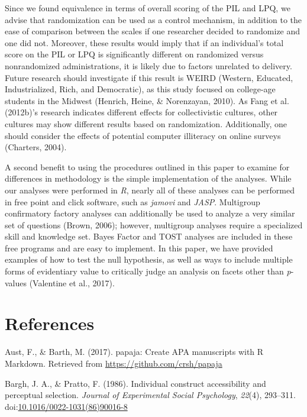 \documentclass[english,man, mask]{apa6}
\theoremstyle{definition}
\theoremstyle{definition}
\theoremstyle{definition}
\theoremstyle{remark}
\begin{document}
Since we found equivalence in terms of overall scoring of the PIL and
LPQ, we advise that randomization can be used as a control mechanism, in
addition to the ease of comparison between the scales if one researcher
decided to randomize and one did not. Moreover, these results would
imply that if an individual's total score on the PIL or LPQ is
significantly different on randomized versus nonrandomized
administrations, it is likely due to factors unrelated to delivery.
Future research should investigate if this result is WEIRD (Western,
Educated, Industrialized, Rich, and Democratic), as this study focused
on college-age students in the Midwest (Henrich, Heine, \& Norenzayan,
2010). As Fang et al. (2012b)'s research indicates different effects for
collectivistic cultures, other cultures may show different results based
on randomization. Additionally, one should consider the effects of
potential computer illiteracy on online surveys (Charters, 2004).

A second benefit to using the procedures outlined in this paper to
examine for differences in methodology is the simple implementation of
the analyses. While our analyses were performed in \emph{R}, nearly all
of these analyses can be performed in free point and click software,
such as \emph{jamovi} and \emph{JASP}. Multigroup confirmatory factory
analyses can additionally be used to analyze a very similar set of
questions (Brown, 2006); however, multigroup analyses require a
specialized skill and knowledge set. Bayes Factor and TOST analyses are
included in these free programs and are easy to implement. In this
paper, we have provided examples of how to test the null hypothesis, as
well as ways to include multiple forms of evidentiary value to
critically judge an analysis on facets other than \emph{p}-values
(Valentine et al., 2017).

\newpage

\section{References}\label{references}

\setlength{\parindent}{-0.5in} \setlength{\leftskip}{0.5in}

\hypertarget{refs}{}
\hypertarget{ref-Aust2017}{}
Aust, F., \& Barth, M. (2017). papaja: Create APA manuscripts with R
Markdown. Retrieved from \url{https://github.com/crsh/papaja}

\hypertarget{ref-Bargh1986}{}
Bargh, J. A., \& Pratto, F. (1986). Individual construct accessibility
and perceptual selection. \emph{Journal of Experimental Social
Psychology}, \emph{22}(4), 293--311.
doi:\href{https://doi.org/10.1016/0022-1031(86)90016-8}{10.1016/0022-1031(86)90016-8}
\end{document}

